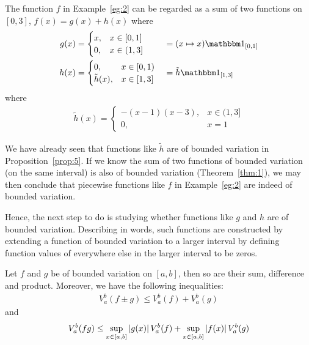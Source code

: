 \documentclass[thmcnt=section, color=blue, 12pt]{my-elegantbook}
\begin{document}
The function $f$ in Example~\ref{eg:2} can be regarded as a sum
of two functions on $[0, 3]$, $f(x) = g(x) + h(x)$ where
\begin{align*}
	g(x) & = \begin{cases}
		         x, & x \in [0, 1] \\
		         0, & x \in (1, 3]
	         \end{cases}            &  & = (x \mapsto x) \ind_{[0, 1]} \\
	h(x) & = \begin{cases}
		         0,            & x \in [0, 1) \\
		         \tilde{h}(x), & x \in [1, 3]
	         \end{cases} &  & = \tilde{h} \ind_{[1, 3]}
\end{align*}
where
\begin{align*}
	\tilde{h}(x) = \begin{cases}
		               -(x-1)(x-3), & x \in (1, 3] \\
		               0,           & x = 1
	               \end{cases}
\end{align*}

We have already seen that functions like $\tilde{h}$ are of bounded variation
in Proposition~\ref{prop:5}.
If we know the sum of two functions of bounded variation (on the same interval)
is also of bounded variation (Theorem~\ref{thm:1}),
we may then conclude that piecewise functions like $f$ in Example~\ref{eg:2}
are indeed of bounded variation.

Hence, the next step to do is studying
whether functions like $g$ and $h$ are of bounded variation.
Describing in words,
such functions are constructed
by extending a function of bounded variation
to a larger interval by defining function values of everywhere else
in the larger interval to be zeros.



\begin{theorem} \label{thm:1}
	Let $f$ and $g$ be of bounded variation on $[a, b]$, then
	so are their sum, difference and product.
	Moreover, we have the following inequalities:
	\begin{align}
		V_a^b (f \pm g)  \leq V_a^b (f) + V_a^b (g)
		\label{eq:3}
	\end{align}
	and
	\begin{align}
		V_a^b (fg)       \leq \sup_{x \in [a, b]} \left\lvert g(x) \right\rvert V_a^b (f)
		+ \sup_{x \in [a, b]} \left\lvert f(x) \right\rvert V_a^b (g)
		\label{eq:4}
	\end{align}
\end{theorem}
\end{document}
